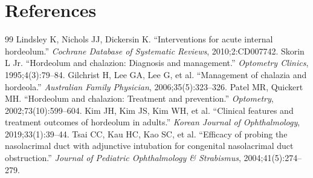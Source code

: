 \section*{References}
\begin{thebibliography}{99}
 Lindsley K, Nichols JJ, Dickersin K. ``Interventions for acute internal hordeolum.'' \textit{Cochrane Database of Systematic Reviews}, 2010;2:CD007742.
 Skorin L Jr. ``Hordeolum and chalazion: Diagnosis and management.'' \textit{Optometry Clinics}, 1995;4(3):79--84.
 Gilchrist H, Lee GA, Lee G, et al. ``Management of chalazia and hordeola.'' \textit{Australian Family Physician}, 2006;35(5):323--326.
 Patel MR, Quickert MH. ``Hordeolum and chalazion: Treatment and prevention.'' \textit{Optometry}, 2002;73(10):599--604.
 Kim JH, Kim JS, Kim WH, et al. ``Clinical features and treatment outcomes of hordeolum in adults.'' \textit{Korean Journal of Ophthalmology}, 2019;33(1):39--44.
 Tsai CC, Kau HC, Kao SC, et al. ``Efficacy of probing the nasolacrimal duct with adjunctive intubation for congenital nasolacrimal duct obstruction.'' \textit{Journal of Pediatric Ophthalmology \& Strabismus}, 2004;41(5):274--279.
\end{thebibliography}
